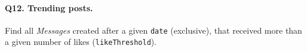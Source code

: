 \paragraph{\textbf{Q12}. Trending posts.}
Find all \emph{Messages} created after a given \texttt{date}
(exclusive), that received more than a given number of likes
(\texttt{likeThreshold}).
